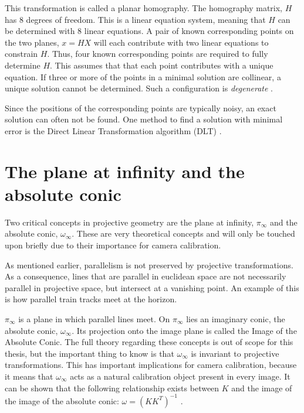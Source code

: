 This transformation is called a planar homography. The homography matrix, $H$ has 8 degrees of freedom. 
This is a linear equation system, meaning that $H$ can be determined with 8 linear equations.
A pair of known corresponding points on the two planes, $x=HX$ will each contribute with two linear equations to constrain $H$.
Thus, four known corresponding points are required to fully determine $H$.
This assumes that that each point contributes with a unique equation.
If three or more of the points in a minimal solution are collinear, a unique solution cannot be determined.
Such a configuration is \textit{degenerate} \cite[p. 91-92]{hartley-zisserman}. 

Since the positions of the corresponding points are typically noisy, an exact solution can often not be found.
One method to find a solution with minimal error is the Direct Linear Transformation algorithm (DLT) \cite{homography-estimation}. 

\section{The plane at infinity and the absolute conic} \label{ac}
Two critical concepts in projective geometry are the plane at infinity, $\pi_{\infty}$ and the absolute conic, $\omega_{\infty}$.
These are very theoretical concepts and will only be touched upon briefly due to their importance for camera calibration.

As mentioned earlier, parallelism is not preserved by projective transformations. 
As a consequence, lines that are parallel in euclidean space are not necessarily parallel in projective space, but intersect at a vanishing point.
An example of this is how parallel train tracks meet at the horizon.

$\pi_{\infty}$ is a plane in which parallel lines meet. 
On $\pi_{\infty}$ lies an imaginary conic, the absolute conic, $\omega_{\infty}$.
Its projection onto the image plane is called the Image of the Absolute Conic.
The full theory regarding these concepts is out of scope for this thesis, but the important thing to know is that $\omega_{\infty}$ is invariant to projective transformations.
This has important implications for camera calibration, because it means that $\omega_{\infty}$ acts as a natural calibration object present in every image.
It can be shown that the following relationship exists between $K$ and the image of the image of the absolute conic:
$\omega = (KK^T)^{-1}$ \cite[p. 210]{hartley-zisserman}\cite{pollefeys}. 

